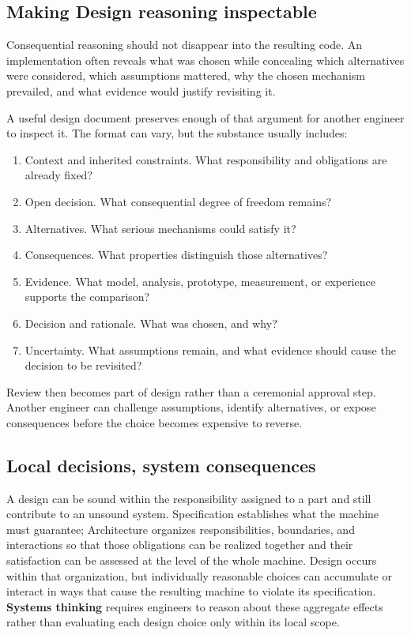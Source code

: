 \subsection{Making Design reasoning inspectable}\label{making-design-reasoning-inspectable}

Consequential reasoning should not disappear into the resulting code.
An implementation often reveals what was chosen while concealing which alternatives were considered, which assumptions mattered, why the chosen mechanism prevailed, and what evidence would justify revisiting it.

A useful design document preserves enough of that argument for another engineer to inspect it.
The format can vary, but the substance usually includes:

\begin{enumerate}
\def\labelenumi{\arabic{enumi}.}
\tightlist
\item
  Context and inherited constraints. What responsibility and obligations are already fixed?
\item
  Open decision. What consequential degree of freedom remains?
\item
  Alternatives. What serious mechanisms could satisfy it?
\item
  Consequences. What properties distinguish those alternatives?
\item
  Evidence. What model, analysis, prototype, measurement, or experience supports the comparison?
\item
  Decision and rationale. What was chosen, and why?
\item
  Uncertainty. What assumptions remain, and what evidence should cause the decision to be revisited?
\end{enumerate}

Review then becomes part of design rather than a ceremonial approval step.
Another engineer can challenge assumptions, identify alternatives, or expose consequences before the choice becomes expensive to reverse.

\subsection{Local decisions, system consequences}\label{local-decisions-system-consequences}

A design can be sound within the responsibility assigned to a part and still contribute to an unsound system.
Specification establishes what the machine must guarantee; Architecture organizes responsibilities, boundaries, and interactions so that those obligations can be realized together and their satisfaction can be assessed at the level of the whole machine.
Design occurs within that organization, but individually reasonable choices can accumulate or interact in ways that cause the resulting machine to violate its specification.
\textbf{Systems thinking} requires engineers to reason about these aggregate effects rather than evaluating each design choice only within its local scope.

